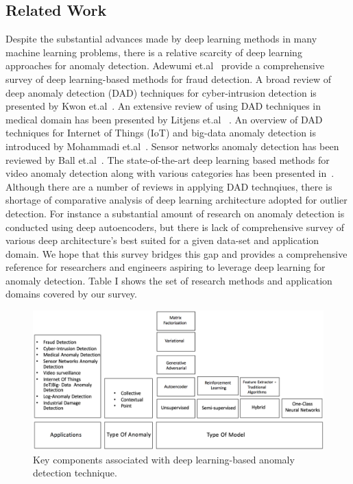 \subsection{Related Work}
Despite the substantial advances made by deep learning methods in many machine learning problems, there
is a relative scarcity of deep learning approaches for anomaly detection. Adewumi et.al~\cite{adewumi2017survey} provide a comprehensive survey of deep learning-based methods for fraud detection. A broad review of deep anomaly detection (DAD) techniques for cyber-intrusion detection is presented by Kwon et.al~\cite{kwon2017survey}. An extensive review of using DAD techniques in medical domain has been presented by Litjens et.al ~\cite{litjens2017survey}. An  overview of DAD techniques for Internet of Things (IoT) and  big-data anomaly detection is introduced by  Mohammadi et.al~\cite{mohammadi2017deep}. Sensor networks anomaly detection has been reviewed  by  Ball et.al~\cite{ball2017comprehensive}. The state-of-the-art deep learning based methods for video anomaly detection along with various categories has been presented in~\cite{kiran2018overview}. Although there are a number of reviews in applying DAD technqiues, there is shortage of comparative analysis of deep learning architecture adopted for outlier detection. For instance a substantial amount of research on anomaly detection is conducted using deep autoencoders, but there is lack of comprehensive survey of various deep architecture's best suited for a given data-set and application domain. We hope that this survey bridges this gap and provides a comprehensive reference for researchers and engineers aspiring to leverage deep learning for anomaly detection. Table I shows the set of research methods and application domains covered by our survey.


\begin{figure}[h]
\includegraphics[scale=0.5]{images/AnomalyDetectionTaxonomy}
\caption{Key components associated with deep learning-based anomaly detection technique.}
\label{fig:surveyTaxonomy}
\end{figure}

